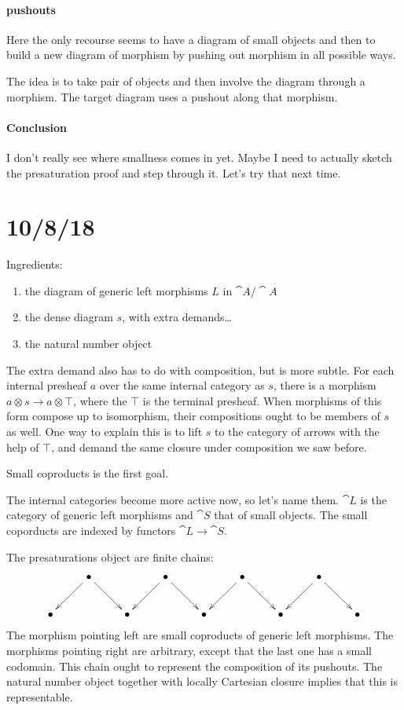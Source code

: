 \documentclass[csh.tex]{subfiles}
\begin{document}
\paragraph{pushouts}
Here the only recourse seems to have a diagram of small objects and then to build a new diagram of morphism by pushing out morphism in all possible ways.

The idea is to take pair of objects and then involve the diagram through a morphism. The target diagram uses a pushout along that morphism.

\paragraph{Conclusion}
I don't really see where smallness comes in yet. Maybe I need to actually sketch the presaturation proof and step through it. Let's try that next time.

\section{10/8/18}

Ingredients:
\begin{enumerate}
\item the diagram of generic left morphisms $L$ in $\cat A/\cat A$
\item the dense diagram $s$, with extra demands\dots
\item the natural number object
\end{enumerate}
The extra demand also has to do with composition, but is more subtle. For each internal presheaf $a$ over the same internal category as $s$, there is a morphism $a\otimes s\to a\otimes \top$, where the $\top$ is the terminal presheaf. When morphisms of this form compose up to isomorphism, their compositions ought to be members of $s$ as well. One way to explain this is to lift $s$ to the category of arrows with the help of $\top$, and demand the same closure under composition we saw before.

Small coproducts is the first goal. 

The internal categories become more active now, so let's name them. $\cat L$ is the category of generic left morphisms and $\cat S$ that of small objects. The small coporducts are indexed by functors $\cat L\to\cat S$.

The presaturations object are finite chains:
\[\xymatrix{
&\bullet \ar[dr]\ar[dl]&&\bullet\ar[dr]\ar[dl] &&\bullet\ar[dr]\ar[dl] &&\bullet\ar[dr]\ar[dl] &\\
\bullet &&\bullet &&\bullet &&\bullet &&\bullet
}\]
The morphism pointing left are small coproducts of generic left morphisms. The morphisms pointing right are arbitrary, except that the last one has a small codomain. This chain ought to represent the composition of its pushouts. The natural number object together with locally Cartesian closure implies that this is representable.
\end{document}
